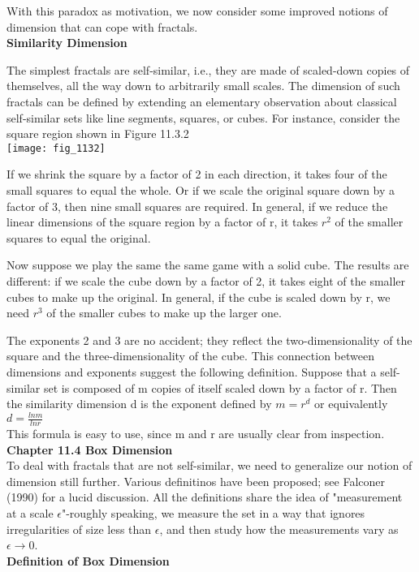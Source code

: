\documentclass{article}
\newcommand\tab[1][1cm]{\hspace*{#1}}
\begin{document}
With this paradox as motivation, we now consider some improved notions of dimension that can cope with fractals. \\

\textbf {Similarity Dimension} \\ \tab

The simplest fractals are self-similar, i.e., they are made of scaled-down copies of themselves, all the way down to arbitrarily small scales. The dimension of such fractals can be defined by extending an elementary observation about classical self-similar sets like line segments, squares, or cubes. For instance, consider the square region shown in Figure 11.3.2 \\ 

\texttt{[image: fig\_1132]}

If we shrink the square by a factor of 2 in each direction, it takes four of the small squares to equal the whole. Or if we scale the original square down by a factor of 3, then nine small squares are required. In general, if we reduce the linear dimensions of the square region by a factor of r, it takes $r^{2}$ of the smaller squares to equal the original. \\ \tab

Now suppose we play the same the same game with a solid cube. The results are different: if we scale the cube down by a factor of 2, it takes eight of the smaller cubes to make up the original. In general, if the cube is scaled down by r, we need $r^{3}$ of the smaller cubes to make up the larger one. \\ \tab

The exponents 2 and 3 are no accident; they reflect the two-dimensionality of the square and the three-dimensionality of the cube. This connection between dimensions and exponents suggest the following definition. Suppose that a self-similar set is composed of m copies of itself scaled down by a factor of r. Then the similarity dimension d is the exponent defined by $m=r^{d}$ or equivalently \\ \tab \tab
$d=\frac{ln m}{ln r}$ \\
This formula is easy to use, since m and r are usually clear from inspection. \\ 

\textbf {Chapter 11.4 Box Dimension} \\

To deal with fractals that are not self-similar, we need to generalize our notion of dimension still further. Various definitinos have been proposed; see Falconer (1990) for a lucid discussion. All the definitions share the idea of "measurement at a scale $\epsilon$"-roughly speaking, we measure the set in a way that ignores irregularities of size less than $\epsilon$, and then study how the measurements vary as $\epsilon \to 0$. \\ 
\textbf {Definition of Box Dimension} \\ \tab
\end{document}
